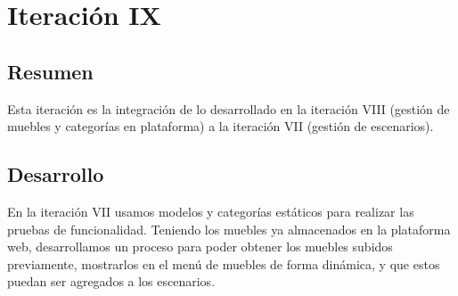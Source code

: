 \section{Iteración IX}
\subsection{Resumen}
Esta iteración es la integración de lo desarrollado en la iteración VIII (gestión de muebles y categorías en plataforma) a la iteración VII (gestión de escenarios).

\subsection{Desarrollo}
En la iteración VII usamos modelos y categorías estáticos para realizar las pruebas de funcionalidad. Teniendo los muebles ya almacenados en la plataforma web, desarrollamos un proceso para poder obtener los muebles subidos previamente, mostrarlos en el menú de muebles de forma dinámica, y que estos puedan ser agregados a los escenarios.